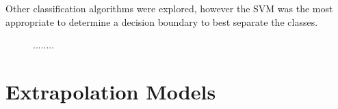 Other classification algorithms were explored, however the SVM was the most appropriate to determine a decision boundary to best separate the classes.

\begin{figure}[htbp!] 
    \centering
    \hfill%
    \caption{........}
    \label{fig:KL-distance}
\end{figure}





\section{Extrapolation Models}
\label{chapter-6-extrapolation}

